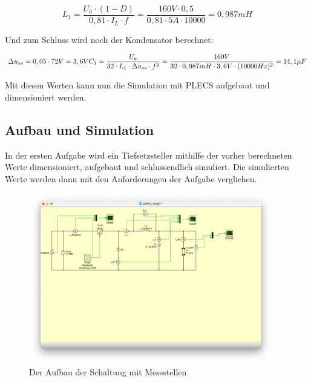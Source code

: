 \documentclass{report}
\begin{document}
\begin{equation}
  L_1 = \frac{U_a \cdot (1-D)}{0,81 \cdot I_L \cdot f} = \frac{160V \cdot 0,5}{0,81 \cdot 5A \cdot 10000} = 0,987mH
  \label{eq:induk}
\end{equation}

Und zum Schluss wird noch der Kondensator berechnet:

\begin{equation}
  \Delta u_{ss} = 0,05 \cdot 72V = 3,6V\\
  C_1 = \frac{U_a}{32 \cdot L_1 \cdot \Delta u_{ss} \cdot f^2} = \frac{160V}{32 \cdot 0,987mH \cdot 3,6V \cdot (10000Hz)^2} = 14,1\mu F 
  \label{eq:capa}
\end{equation}


Mit diesen Werten kann nun die Simulation mit PLECS aufgebaut und dimensioniert werden.


\subsection{Aufbau und Simulation}

In der ersten Aufgabe wird ein Tiefsetzsteller mithilfe der vorher berechneten Werte dimensioniert, aufgebaut und schlussendlich simuliert. Die simulierten Werte werden dann mit den Anforderungen der Aufgabe verglichen.

\begin{figure}
  \begin{center}
    \includegraphics[width=0.95\textwidth]{assets/img/aufg1_aufbau.png}
  \end{center}
  \caption{Der Aufbau der Schaltung mit Messstellen}
  \label{fig:aufg1_aufbau}
\end{figure}
\end{document}
